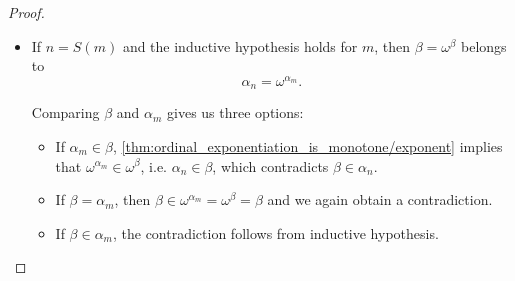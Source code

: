 \begin{proof}
\begin{itemize}
    \item If \( n = S(m) \) and the inductive hypothesis holds for \( m \), then \( \beta = \omega^\beta \) belongs to
    \begin{equation*}
      \alpha_n
      =
      \omega^{\alpha_m}.
    \end{equation*}

    Comparing \( \beta \) and \( \alpha_m \) gives us three options:
    \begin{itemize}
      \item If \( \alpha_m \in \beta \), \cref{thm:ordinal_exponentiation_is_monotone/exponent} implies that \( \omega^{\alpha_m} \in \omega^\beta \), i.e. \( \alpha_n \in \beta \), which contradicts \( \beta \in \alpha_n \).

      \item If \( \beta = \alpha_m \), then \( \beta \in \omega^{\alpha_m} = \omega^\beta = \beta \) and we again obtain a contradiction.

      \item If \( \beta \in \alpha_m \), the contradiction follows from inductive hypothesis.
    \end{itemize}
  \end{itemize}
\end{proof}
